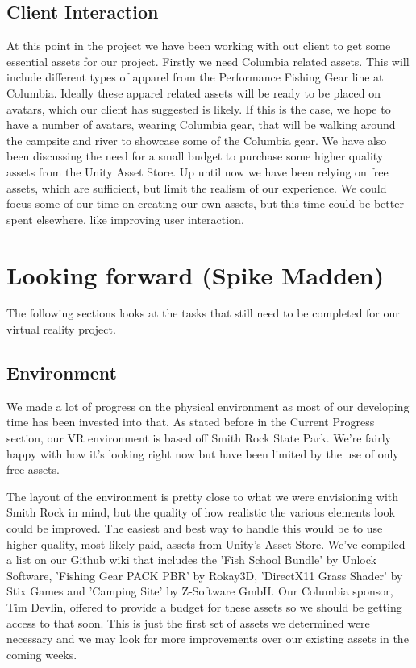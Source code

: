 \documentclass[10pt,journal,compsoc,onecolumn, draftclsnofoot]{IEEEtran}
\begin{document}
\subsection{Client Interaction}
At this point in the project we have been working with out client to get some essential assets for our project.
Firstly we need Columbia related assets.
This will include different types of apparel from the Performance Fishing Gear line at Columbia.
Ideally these apparel related assets will be ready to be placed on avatars, which our client has suggested is likely.
If this is the case, we hope to have a number of avatars, wearing Columbia gear, that will be walking around the campsite and river to showcase some of the Columbia gear.
We have also been discussing the need for a small budget to purchase some higher quality assets from the Unity Asset Store.
Up until now we have been relying on free assets, which are sufficient, but limit the realism of our experience.
We could focus some of our time on creating our own assets, but this time could be better spent elsewhere, like improving user interaction.

\section{Looking forward (Spike Madden)}
The following sections looks at the tasks that still need to be completed for our virtual reality project.

\subsection{Environment}
We made a lot of progress on the physical environment as most of our developing time has been invested into that. As stated before in the Current Progress section, our VR environment is based off Smith Rock State Park. We're fairly happy with how it's looking right now but have been limited by the use of only free assets.

The layout of the environment is pretty close to what we were envisioning with Smith Rock in mind, but the quality of how realistic the various elements look could be improved. The easiest and best way to handle this would be to use higher quality, most likely paid, assets from Unity's Asset Store. We've compiled a list on our Github wiki that includes the 'Fish School Bundle' by Unlock Software, 'Fishing Gear PACK PBR' by Rokay3D, 'DirectX11 Grass Shader' by Stix Games and 'Camping Site' by Z-Software GmbH. Our Columbia sponsor, Tim Devlin, offered to provide a budget for these assets so we should be getting access to that soon. This is just the first set of assets we determined were necessary and we may look for more improvements over our existing assets in the coming weeks.
\end{document}
